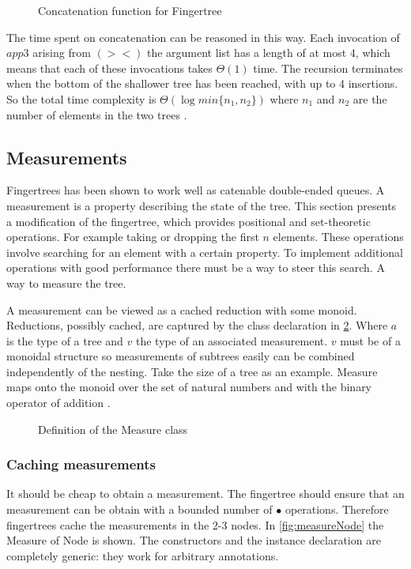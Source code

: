 \begin{figure}[h!]

\caption{Concatenation function for Fingertree \label{fig:concat}}
\end{figure}

The time spent on concatenation can be reasoned in this way. Each invocation of
$app3$ arising from $(><)$ the argument list has a length of at most 4, which
means that each of these invocations takes $\Theta(1)$ time. The recursion
terminates when the bottom of the shallower tree has been reached, with up to
4 insertions. So the total time complexity is $\Theta(\log min\{n_1, n_2\})$
where $n_1$ and $n_2$ are the number of elements in the two trees
\cite{fingertree}.

\subsection{Measurements}
Fingertrees has been shown to work well as catenable double-ended queues. A 
measurement is a property describing the state of the tree. This section
presents a modification of the fingertree, which provides positional and
set-theoretic operations. For example taking or dropping the first $n$ elements.
These operations involve searching for an element with a certain property.
To implement additional operations with good performance there must be a way
to steer this search. A way to measure the tree.

A measurement can be viewed as a cached reduction with some monoid. 
Reductions, possibly cached, are captured by the class declaration in 
\cref{fig:measure}. Where $a$ is the type of a tree and $v$ the type of an
associated measurement. $v$ must be of a monoidal structure so measurements of
subtrees easily can be combined independently of the nesting. Take the size of a
tree as an example. Measure maps onto the monoid over the set of natural numbers
and with the binary operator of addition \cite{fingertree}.

\begin{figure}[h!]

\caption{Definition of the Measure class \label{fig:measure}}
\end{figure}

\subsubsection{Caching measurements}
It should be cheap to obtain a measurement. The fingertree should ensure that an
measurement can be obtain with a bounded number of $\bullet$ operations.
Therefore fingertrees cache the measurements in the 2-3 nodes. In
\cref{fig:measureNode} the Measure of Node is shown.
The constructors and the instance declaration are completely generic: they
work for arbitrary annotations.

